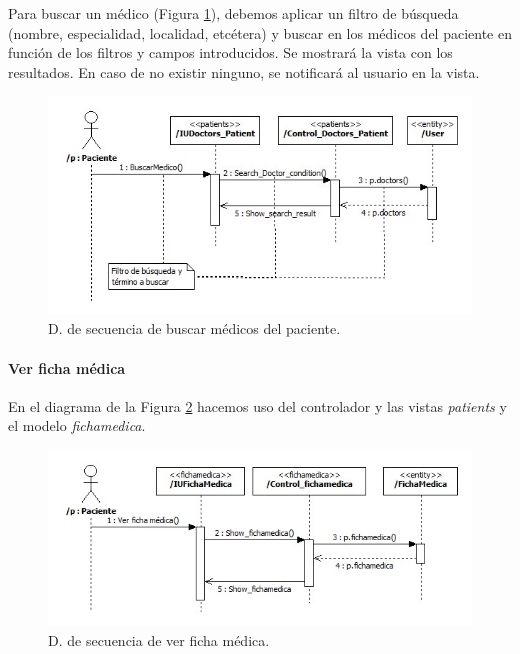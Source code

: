 					Para buscar un médico (Figura \ref{fig:cont_patient_doc_search}), debemos aplicar un filtro de búsqueda (nombre, especialidad, localidad, etcétera) y buscar en los médicos del paciente en función de los filtros y campos introducidos. Se mostrará la vista con los resultados. En caso de no existir ninguno, se notificará al usuario en la vista.
					
					\begin{figure}[H]
					  \centering
					    \includegraphics[width=13cm]{img/jpg/secuencia/13_patients_search_doctor.jpg}
					  \caption{D. de secuencia de buscar médicos del paciente.}
					  \label{fig:cont_patient_doc_search}
					\end{figure}
				
				
				\bigskip
				\bigskip		
				\paragraph{Ver ficha médica} %
				\label{subp:cont_ver_ficha_medica2}
					
					En el diagrama de la Figura \ref{fig:cont_patient_ficha} hacemos uso del controlador y las vistas \textit{patients} y el modelo \textit{fichamedica}.
						
						\begin{figure}[H]
						  \centering
						    \includegraphics[width=14cm]{img/jpg/secuencia/11_patients_fichamedica.jpg}
						  \caption{D. de secuencia de ver ficha médica.}
						  \label{fig:cont_patient_ficha}
						\end{figure}
				
